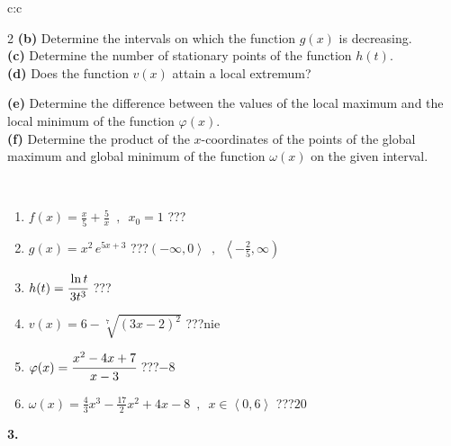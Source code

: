 \documentclass[10pt]{report}
\begin{document}
\begin{tabular}{c:c}
\begin{minipage}[c][104.5mm][t]{0.5\linewidth}
\begin{center}
\begin{minipage}{0.95\linewidth}
\begin{center}
{\begin{multicols}{2}
\textbf{(b)} Determine the intervals on which the function \(g(x)\) is decreasing. \\[1mm]
\textbf{(c)} Determine the number of stationary points of the function \(h(t)\). \\[1mm]
\textbf{(d)} Does the function \(v(x)\) attain a local extremum? \par \columnbreak
\textbf{(e)} Determine the difference between the values of the local maximum and the local minimum of the function \(\varphi(x)\). \\[1mm]
\textbf{(f)} Determine the product of the \(x\)-coordinates of the points of the global maximum and global minimum of the function \(\omega(x)\) on the given interval. \\[1mm]
\end{multicols}
}
\end{center}
\end{minipage}
\\[1mm]
\begin{minipage}{0.79\linewidth}
\begin{center}
\begin{varwidth}{\linewidth}
\setlength{\itemsep}{0pt}
\begin{enumerate}
\normalsize
\item $f(x)=\frac{x}{5}+\frac{5}{x} \enspace , \enspace x_0=1$\quad \dotfill\; ???\;\dotfill \quad {}
\item $g(x)=x^2\, e^{5x+3}$\quad \dotfill\; ???\;\dotfill \quad $\left(-\infty , 0\right\rangle\enspace , \enspace \left\langle-\frac{2}{5} , \infty\right)$
\item $h(t)=\cfrac{\ln t}{3t^3}$\quad \dotfill\; ???\;\dotfill {}
\item $v(x)=6-\sqrt[7]{(3x-2)^2}$\quad \dotfill\; ???\;\dotfill \quad $\text{nie}$
\item $\varphi(x)=\cfrac{x^2-4x+7}{x-3}$\quad \dotfill\; ???\;\dotfill \quad $-8$
\item $\omega(x)=\frac{4}{3}x^3-\frac{17}{2}x^2+4x-8 \enspace , \enspace x\in\left\langle0 , 6\right\rangle$\quad \dotfill\; ???\;\dotfill \quad $20$
\end{enumerate}
\end{varwidth}
\end{center}
\end{minipage}
\begin{minipage}{0.20\linewidth}
\begin{center}
{\Huge\bfseries 3.} \\[2mm]

\end{center}
\end{minipage}
\end{center}
\end{minipage}
\end{tabular}
\end{document}
